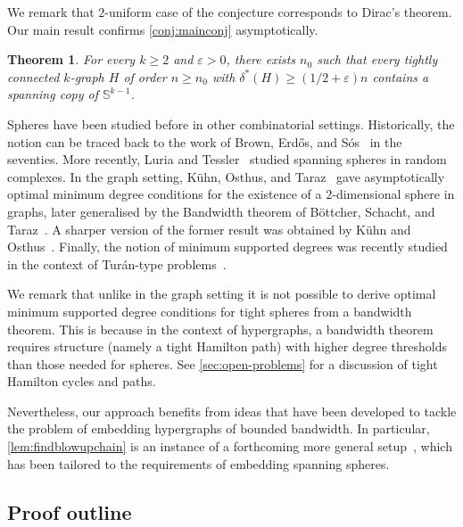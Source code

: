\documentclass[12pt,reqno]{amsart}
\theoremstyle{plain}
\newtheorem{theorem}{Theorem}[section]
\theoremstyle{definition}
\numberwithin{equation}{section}
\renewcommand{\ge}{\geqslant}
\renewcommand{\geq}{\geqslant}
\newcommand{\eps}{\varepsilon}
\newcommand{\comin}{\delta^{\ast}}
\newcommand{\bS}{\mathbb{S}}
\begin{document}
	We remark that $2$-uniform case of the conjecture corresponds to Dirac's theorem.
	Our main result confirms \cref{conj:mainconj} asymptotically.
	
	\begin{theorem}\label{thm:maintheorem}
		For every $k \geq 2$ and $\eps>0$, there exists $n_0$ such that every tightly connected $k$-graph $H$ of order $n \geq n_0$ with $\comin(H) \ge (1/2+\eps)n$ contains a spanning copy of $\bS^{k - 1}$.
	\end{theorem}
	
	Spheres have been studied before in other combinatorial settings.
	Historically, the notion can be traced back to the work of Brown, Erdős, and Sós~\cite{SEB73} in the seventies.
	More recently, Luria and Tessler~\cite{LT19} studied spanning spheres in random complexes.
	In the graph setting, Kühn, Osthus, and Taraz~\cite{KOT05} gave asymptotically optimal minimum degree conditions for the existence of a $2$-dimensional sphere in graphs, later generalised by the Bandwidth theorem of B\"{o}ttcher, Schacht, and Taraz~\cite{BST09}.
	A sharper version of the former result was obtained by Kühn and Osthus~\cite{KO05}.
	Finally, the notion of minimum supported degrees was recently studied in the context of Tur\'an-type problems~\cite{Bal21,Pik23}.
	
	We remark that unlike in the graph setting it is not possible to derive optimal minimum supported degree conditions for tight spheres from a bandwidth theorem.
	This is because in the context of hypergraphs, a bandwidth theorem requires structure (namely a tight Hamilton path) with higher degree thresholds than those needed for spheres.
	See \cref{sec:open-problems} for a discussion of tight Hamilton cycles and paths.
	
	Nevertheless, our approach benefits from ideas that have been developed to tackle the problem of embedding hypergraphs of bounded bandwidth.
	In particular, \cref{lem:findblowupchain} is an instance of a forthcoming more general setup~\cite{LS24}, which has been tailored to the requirements of embedding spanning spheres.
	
	\subsection{Proof outline}
	
\end{document}
